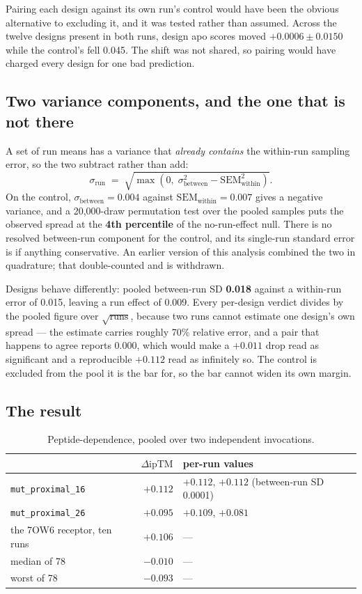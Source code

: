 \documentclass[11pt,a4paper]{article}
\newcommand{\drop}{\ensuremath{\Delta\text{ipTM}}}
\begin{document}
Pairing each design against its own run's control would have been the obvious alternative to
excluding it, and it was tested rather than assumed. Across the twelve designs present in both
runs, design apo scores moved $+0.0006 \pm 0.0150$ while the control's fell 0.045. The shift was
not shared, so pairing would have charged every design for one bad prediction.

\subsection{Two variance components, and the one that is not there}

A set of run means has a variance that \emph{already contains} the within-run sampling error, so
the two subtract rather than add:
\begin{equation}
\sigma_{\text{run}} \;=\; \sqrt{\max\!\left(0,\; \sigma^2_{\text{between}} - \mathrm{SEM}^2_{\text{within}}\right)}.
\end{equation}
On the control, $\sigma_{\text{between}} = 0.004$ against $\mathrm{SEM}_{\text{within}} = 0.007$
gives a negative variance, and a 20{,}000-draw permutation test over the pooled samples puts the
observed spread at the \textbf{4th percentile} of the no-run-effect null. There is no resolved
between-run component for the control, and its single-run standard error is if anything
conservative. An earlier version of this analysis combined the two in quadrature; that
double-counted and is withdrawn.

Designs behave differently: pooled between-run SD \textbf{0.018} against a within-run error of
0.015, leaving a run effect of 0.009. Every per-design verdict divides by the pooled figure over
$\sqrt{\text{runs}}$, because two runs cannot estimate one design's own spread --- the estimate
carries roughly 70\% relative error, and a pair that happens to agree reports 0.000, which would
make a $+0.011$ drop read as significant and a reproducible $+0.112$ read as infinitely so. The
control is excluded from the pool it is the bar for, so the bar cannot widen its own margin.

\subsection{The result}

\begin{table}[h]
\centering
\caption{Peptide-dependence, pooled over two independent invocations.}
\small
\begin{tabular}{lrl}
\toprule
 & \drop & per-run values \\
\midrule
\texttt{mut\_proximal\_16} & $\mathbf{+0.112}$ & $+0.112$, $+0.112$ (between-run SD 0.0001) \\
\texttt{mut\_proximal\_26} & $+0.095$ & $+0.109$, $+0.081$ \\
the 7OW6 receptor, ten runs & $+0.106$ & --- \\
median of 78 & $-0.010$ & --- \\
worst of 78 & $-0.093$ & --- \\
\bottomrule
\end{tabular}
\end{table}
\end{document}
